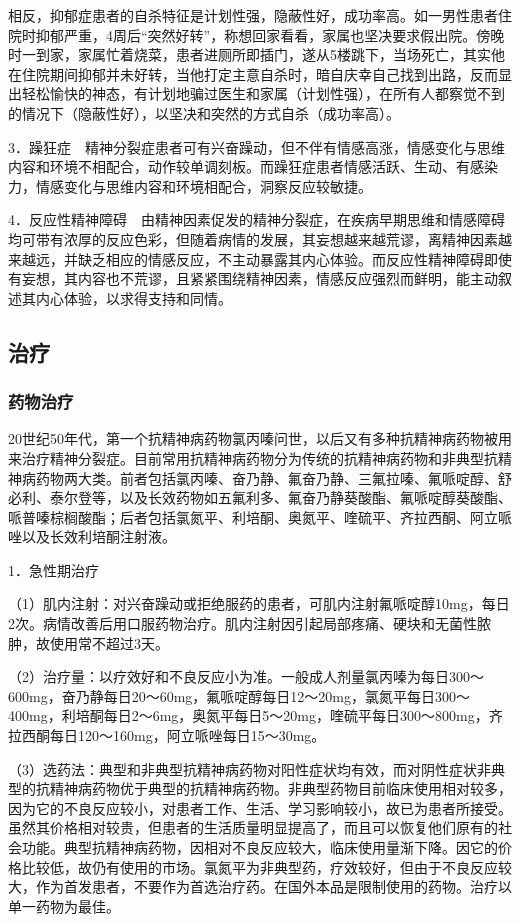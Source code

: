 相反，抑郁症患者的自杀特征是计划性强，隐蔽性好，成功率高。如一男性患者住院时抑郁严重，4周后``突然好转''，称想回家看看，家属也坚决要求假出院。傍晚时一到家，家属忙着烧菜，患者进厕所即插门，遂从5楼跳下，当场死亡，其实他在住院期间抑郁并未好转，当他打定主意自杀时，暗自庆幸自己找到出路，反而显出轻松愉快的神态，有计划地骗过医生和家属（计划性强），在所有人都察觉不到的情况下（隐蔽性好），以坚决和突然的方式自杀（成功率高）。

3．躁狂症　精神分裂症患者可有兴奋躁动，但不伴有情感高涨，情感变化与思维内容和环境不相配合，动作较单调刻板。而躁狂症患者情感活跃、生动、有感染力，情感变化与思维内容和环境相配合，洞察反应较敏捷。

4．反应性精神障碍　由精神因素促发的精神分裂症，在疾病早期思维和情感障碍均可带有浓厚的反应色彩，但随着病情的发展，其妄想越来越荒谬，离精神因素越来越远，并缺乏相应的情感反应，不主动暴露其内心体验。而反应性精神障碍即使有妄想，其内容也不荒谬，且紧紧围绕精神因素，情感反应强烈而鲜明，能主动叙述其内心体验，以求得支持和同情。

\subsection{治疗}

\subsubsection{药物治疗}

20世纪50年代，第一个抗精神病药物氯丙嗪问世，以后又有多种抗精神病药物被用来治疗精神分裂症。目前常用抗精神病药物分为传统的抗精神病药物和非典型抗精神病药物两大类。前者包括氯丙嗪、奋乃静、氟奋乃静、三氟拉嗪、氟哌啶醇、舒必利、泰尔登等，以及长效药物如五氟利多、氟奋乃静葵酸酯、氟哌啶醇葵酸酯、哌普嗪棕榈酸酯；后者包括氯氮平、利培酮、奥氮平、喹硫平、齐拉西酮、阿立哌唑以及长效利培酮注射液。

1．急性期治疗

（1）肌内注射：对兴奋躁动或拒绝服药的患者，可肌内注射氟哌啶醇10mg，每日2次。病情改善后用口服药物治疗。肌内注射因引起局部疼痛、硬块和无菌性脓肿，故使用常不超过3天。

（2）治疗量：以疗效好和不良反应小为准。一般成人剂量氯丙嗪为每日300～600mg，奋乃静每日20～60mg，氟哌啶醇每日12～20mg，氯氮平每日300～400mg，利培酮每日2～6mg，奥氮平每日5～20mg，喹硫平每日300～800mg，齐拉西酮每日120～160mg，阿立哌唑每日15～30mg。

（3）选药法：典型和非典型抗精神病药物对阳性症状均有效，而对阴性症状非典型的抗精神病药物优于典型的抗精神病药物。非典型药物目前临床使用相对较多，因为它的不良反应较小，对患者工作、生活、学习影响较小，故已为患者所接受。虽然其价格相对较贵，但患者的生活质量明显提高了，而且可以恢复他们原有的社会功能。典型抗精神病药物，因相对不良反应较大，临床使用量渐下降。因它的价格比较低，故仍有使用的市场。氯氮平为非典型药，疗效较好，但由于不良反应较大，作为首发患者，不要作为首选治疗药。在国外本品是限制使用的药物。治疗以单一药物为最佳。

